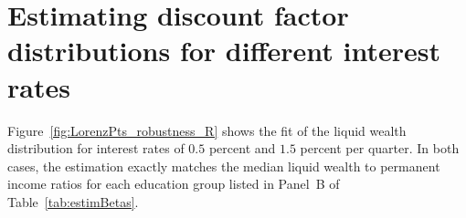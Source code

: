 \documentclass[../HAFiscal]{subfiles}
\begin{document}

\hypertarget{Appendices}{} %

\section{Estimating discount factor distributions for different interest rates}
\label{app:DF_R}

Figure~\ref{fig:LorenzPts_robustness_R} shows the fit of the liquid wealth distribution for interest rates of $0.5$ percent and $1.5$ percent per quarter. In both cases, the estimation exactly matches the median liquid wealth to permanent income ratios for each education group listed in Panel~B of Table~\ref{tab:estimBetas}. 

\end{document}
